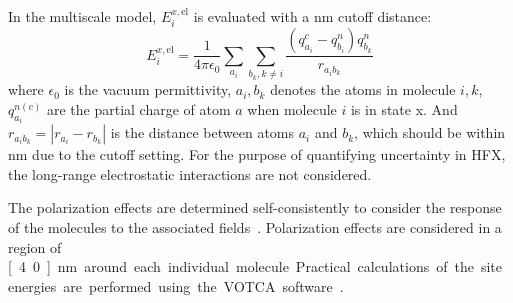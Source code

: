\documentclass[%
 reprint,
 amsmath,amssymb,
 aps,
]{revtex4-2}
\begin{document}
In the multiscale model, $E_i^{x,\text{el}}$ is evaluated with a \unit[4]{nm} cutoff distance:
\begin{equation}
    E_i^{x,\text{el}} = \frac{1}{4 \pi \epsilon_0} \sum\limits_{a_i} \sum\limits_{b_k,k \neq i} \frac{(q^c_{a_i} - q^n_{b_i})q^n_{b_k}}{ r_{a_i b_k}} 
\end{equation}
where $\epsilon_0$ is the vacuum permittivity, $a_i, b_k$ denotes the atoms in molecule $i,k$, $q^{n(c)}_{a_i}$ are the partial charge of atom $a$ when molecule $i$ is in state x. And $r_{a_i b_k} = |r_{a_i} - r_{b_k}|$ is the distance between atoms $a_i$ and $b_k$, which should be within \unit[4]{nm} due to the cutoff setting. 
For the purpose of quantifying uncertainty in HFX, the long-range electrostatic interactions are not considered. 

The polarization effects are determined self-consistently to consider the response of the molecules to the associated fields~\cite{thole_molecular_1981}.
Polarization effects are considered in a region of \unit[4.0]{nm} around each individual molecule. Practical calculations of the site energies are performed using the VOTCA software~\cite{Baumeier2011,doi:10.1021/acs.jctc.8b00617,10.1063/1.5144277,Baumeier2024}.
\end{document}
